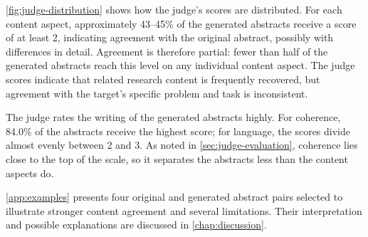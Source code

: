 \autoref{fig:judge-distribution} shows how the judge's scores are distributed. For each content aspect, approximately 43--45\% of the generated abstracts receive a score of at least 2, indicating agreement with the original abstract, possibly with differences in detail. Agreement is therefore partial: fewer than half of the generated abstracts reach this level on any individual content aspect. The judge scores indicate that related research content is frequently recovered, but agreement with the target's specific problem and task is inconsistent.

The judge rates the writing of the generated abstracts highly. For coherence, 84.0\% of the abstracts receive the highest score; for language, the scores divide almost evenly between 2 and 3. As noted in \autoref{sec:judge-evaluation}, coherence lies close to the top of the scale, so it separates the abstracts less than the content aspects do.

\autoref{app:examples} presents four original and generated abstract pairs selected to illustrate stronger content agreement and several limitations. Their interpretation and possible explanations are discussed in \autoref{chap:discussion}.
